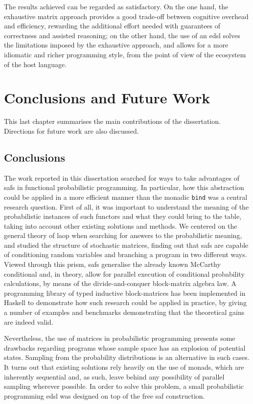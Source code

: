 \documentclass[
  oneside,
  11pt, a4paper,
  footinclude=true,
  headinclude=true,
  cleardoublepage=empty
]{scrbook}
\theoremstyle{definition}
\theoremstyle{definition}
\begin{document}
    The results achieved can be regarded as satisfactory. On the one hand, the exhaustive matrix approach provides a good trade-off between cognitive overhead and efficiency, rewarding the additional effort needed with guarantees of correctness and assisted reasoning; on the other hand, the use of an \gls{edsl} solves the limitations imposed by the exhaustive approach, and allows for a more idiomatic and richer programming style, from the point of view of the ecosystem of the host language.
    
	\chapter{Conclusions and Future Work}\label{ch-conclusion}
	    This last chapter summarises the main  contributions of the dissertation. Directions for future work are also discussed.
	
	   \section{Conclusions}
	   The work reported in this dissertation searched for ways to take advantages of \glspl{saf} in functional probabilistic programming. In particular, how this abstraction could be applied in a more efficient manner than the monadic \texttt{bind} was a central research question. First of all, it was important to understand the meaning of the probabilistic instances of such functors and what they could bring to the table, taking into account other existing solutions and methods.
	        We centered on the general theory of \gls{laop} when searching for answers to the probabilistic meaning, and studied the structure of stochastic matrices, finding out that \glspl{saf} are capable of conditioning random variables and branching a program in two different ways. Viewed through this prism, \glspl{saf} generalise the already known McCarthy conditional and, in theory, allow for parallel execution of conditional probability calculations, by means of the divide-and-conquer block-matrix algebra law. A programming library of typed inductive block-matrices has been implemented in Haskell to demonstrate how such research could be applied in practice, by giving a number of examples and benchmarks demonstrating that the theoretical gains are indeed valid. 
	        
	        Nevertheless, the use of matrices in probabilistic programming presents some drawbacks regarding programs whose sample space has an explosion of potential states. Sampling from the probability distributions is an alternative in such cases. It turns out that existing solutions rely heavily on the use of monads, which are inherently sequential and, as such, leave behind any possibility of parallel sampling wherever possible. In order to solve this problem, a small probabilistic programming \gls{edsl} was designed on top of the free \gls{saf} construction.
	        
\end{document}
